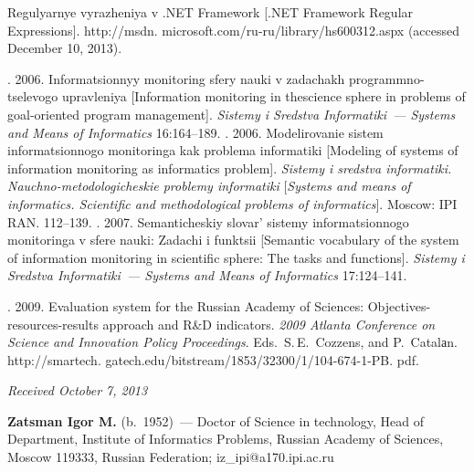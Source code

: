 \begin{multicols}{2}
{{\begin{thebibliography}{99}
 
      Regulyarnye vyrazheniya v .NET Framework [.NET Framework Regular Expressions].  {\sf 
http://msdn. microsoft.com/ru-ru/library/hs600312.aspx}
(accessed December 10, 2013).

      . 2006. Informatsionnyy monitoring sfery nauki v 
zadachakh programmno-tselevogo upravleniya [Information monitoring in the\linebreak science sphere in 
problems of goal-oriented program management]. \textit{Sistemy i
Sredstva Informatiki~---
Systems and Means of Informatics} 
16:164--189. 
 . 2006. Mo\-de\-li\-ro\-vanie sistem informatsionnogo monitoringa kak problema 
informatiki [Modeling of systems of information monitoring as informatics problem]. 
\textit{Sistemy i sredstva informatiki. Nauchno-metodologicheskie problemy informatiki} 
[\textit{Systems  and means of informatics.  Scientific and 
methodological problems of informatics}]. Moscow: IPI RAN. 112--139.
      . 2007. Semanticheskiy slovar' sistemy informatsionnogo 
monitoringa v sfere nauki: Zadachi i funktsii [Semantic vocabulary of the system of information 
monitoring in scientific sphere: The tasks and functions]. 
\textit{Sistemy i
Sredstva Informatiki~---
Systems and Means of Informatics}
 17:124--141.


 
. 2009. Evaluation system for the Russian Academy of 
Sciences: Objectives-resources-results approach and R\&D indicators. \textit{2009 Atlanta Conference 
on Science and Innovation Policy  Proceedings}. Eds.\ S.\,E.~Cozzens,  and P.~Catalаn. {\sf 
http://smartech. gatech.edu/bitstream/1853/32300/1/104-674-1-PB. pdf}.
      
      
\end{thebibliography}
} }


\end{multicols}

\hfill{\small\textit{Received October 7, 2013}}

\Contr

\noindent
\textbf{Zatsman Igor M.} (b.\ 1952)~--- Doctor of Science in technology, Head of Department, 
Institute of Informatics Problems, Russian Academy of Sciences, Moscow 119333,
Russian Federation; iz\_ipi@a170.ipi.ac.ru

